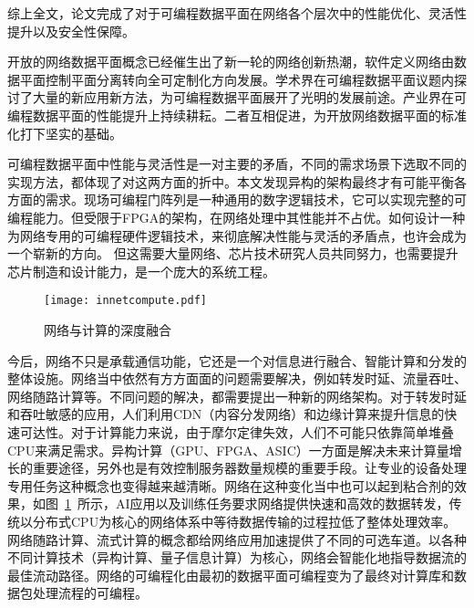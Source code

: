 综上全文，论文完成了对于可编程数据平面在网络各个层次中的性能优化、灵活性提升以及安全性保障。





\label{chap62}

\label{chap621}

开放的网络数据平面概念已经催生出了新一轮的网络创新热潮，软件定义网络由数据平面控制平面分离转向全可定制化方向发展。学术界在可编程数据平面议题内探讨了大量的新应用新方法，为可编程数据平面展开了光明的发展前途。产业界在可编程数据平面的性能提升上持续耕耘。二者互相促进，为开放网络数据平面的标准化打下坚实的基础。

可编程数据平面中性能与灵活性是一对主要的矛盾，不同的需求场景下选取不同的实现方法，都体现了对这两方面的折中。本文发现异构的架构最终才有可能平衡各方面的需求。现场可编程门阵列是一种通用的数字逻辑技术，它可以实现完整的可编程能力。但受限于FPGA的架构，在网络处理中其性能并不占优。如何设计一种为网络专用的可编程硬件逻辑技术，来彻底解决性能与灵活的矛盾点，也许会成为一个崭新的方向。
但这需要大量网络、芯片技术研究人员共同努力，也需要提升芯片制造和设计能力，是一个庞大的系统工程。




\label{chap622}

\begin{figure}[!ht]
	\centering 
	\vspace{-1.5mm} 
	\texttt{[image: innetcompute.pdf]}
	\caption{网络与计算的深度融合} \label{fig:innetcompute}
\end{figure}

今后，网络不只是承载通信功能，它还是一个对信息进行融合、智能计算和分发的整体设施。网络当中依然有方方面面的问题需要解决，例如转发时延、流量吞吐、网络随路计算等。不同问题的解决，都需要提出一种新的网络架构。对于转发时延和吞吐敏感的应用，人们利用CDN（内容分发网络）和边缘计算来提升信息的快速可达性。对于计算能力来说，由于摩尔定律失效，人们不可能只依靠简单堆叠CPU来满足需求。异构计算（GPU、FPGA、ASIC）一方面是解决未来计算量增长的重要途径，另外也是有效控制服务器数量规模的重要手段。让专业的设备处理专用任务这种概念也变得越来越清晰。网络在这种变化当中也可以起到粘合剂的效果，如图~\ref{fig:innetcompute}~所示，AI应用以及训练任务要求网络提供快速和高效的数据转发，传统以分布式CPU为核心的网络体系中等待数据传输的过程拉低了整体处理效率。网络随路计算、流式计算的概念都给网络应用加速提供了不同的可选车道。以各种不同计算技术（异构计算、量子信息计算）为核心，网络会智能化地指导数据流的最佳流动路径。网络的可编程化由最初的数据平面可编程变为了最终对计算库和数据包处理流程的可编程。










